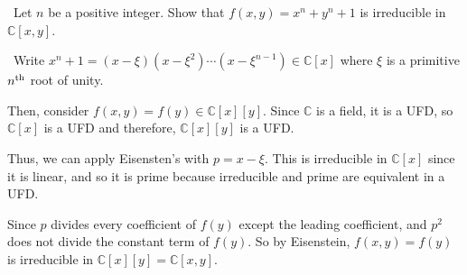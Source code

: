 \documentclass[12pt]{Qual}
\begin{document}
\begin{problem} $\,$
Let $n$ be a positive integer. Show that $f(x,y)=x^n+y^n+1$ is irreducible in $\mathbb{C}[x,y]$.
\end{problem}


\begin{solution}$\,$
Write $x^n+1=(x-\xi)(x-\xi^2)\cdots(x-\xi^{n-1})\in\mathbb{C}[x]$ where $\xi$ is a primitive $n^\text{th}$ root of unity.

Then, consider $f(x,y)=f(y)\in\mathbb{C}[x][y]$. Since $\mathbb{C}$ is a field, it is a UFD, so $\mathbb{C}[x]$ is a UFD and therefore, $\mathbb{C}[x][y]$ is a UFD.

Thus, we can apply Eisensten's with $p=x-\xi$. This is irreducible in $\mathbb{C}[x]$ since it is linear, and so it is prime because irreducible and prime are equivalent in a UFD.

Since $p$ divides every coefficient of $f(y)$ except the leading coefficient, and $p^2$ does not divide the constant term of $f(y)$. So by Eisenstein, $f(x,y)=f(y)$ is irreducible in $\mathbb{C}[x][y]=\mathbb{C}[x,y].$
\end{solution}
\end{document}
